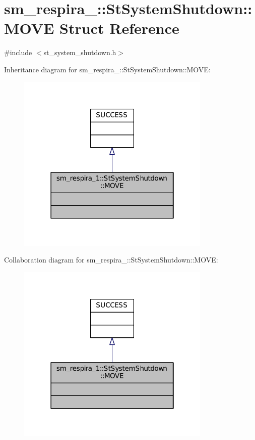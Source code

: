 \hypertarget{structsm__respira__1_1_1StSystemShutdown_1_1MOVE}{}\section{sm\+\_\+respira\+\_\+:\+:St\+System\+Shutdown\+:\+:M\+O\+VE Struct Reference}
\label{structsm__respira__1_1_1StSystemShutdown_1_1MOVE}


{\ttfamily \#include $<$st\+\_\+system\+\_\+shutdown.\+h$>$}



Inheritance diagram for sm\+\_\+respira\+\_\+:\+:St\+System\+Shutdown\+:\+:M\+O\+VE\+:
\nopagebreak
\begin{figure}[H]
\begin{center}
\leavevmode
\includegraphics[width=262pt]{structsm__respira__1_1_1StSystemShutdown_1_1MOVE__inherit__graph}
\end{center}
\end{figure}


Collaboration diagram for sm\+\_\+respira\+\_\+:\+:St\+System\+Shutdown\+:\+:M\+O\+VE\+:
\nopagebreak
\begin{figure}[H]
\begin{center}
\leavevmode
\includegraphics[width=262pt]{structsm__respira__1_1_1StSystemShutdown_1_1MOVE__coll__graph}
\end{center}
\end{figure}


